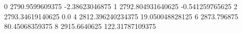 0 2790.9599609375 -2.38623046875
1 2792.804931640625 -0.541259765625
2 2793.34619140625 0.0
4 2812.396240234375 19.050048828125
6 2873.796875 80.45068359375
8 2915.6640625 122.31787109375
